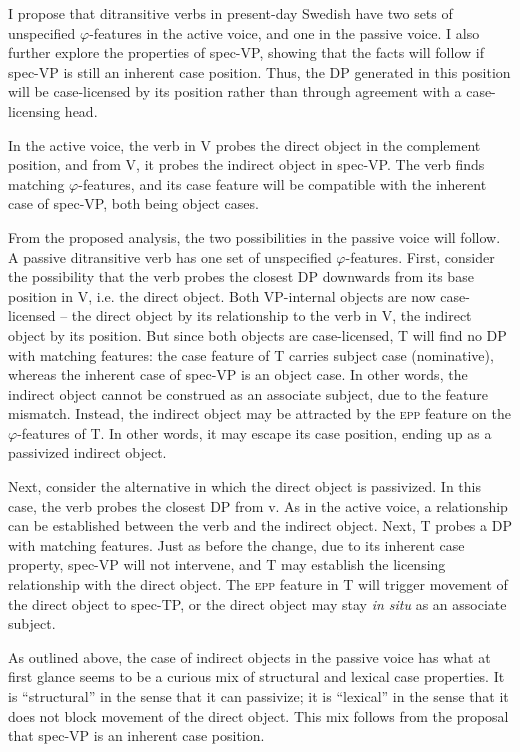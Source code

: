 \documentclass[output=paper]{langscibook}
\begin{document}
I propose that ditransitive verbs in present-day Swedish have two sets of unspecified $\varphi $-features in the active voice, and one in the passive voice. I also further explore the properties of spec-VP, showing that the facts will follow if spec-VP is still an inherent case position. Thus, the DP generated in this position will be case-licensed by its position rather than through agreement with a case-licensing head.



In the active voice, the verb in V probes the direct object in the complement position, and from V, it probes the indirect object in spec-VP. The verb finds matching $\varphi $-features, and its case feature will be compatible with the inherent case of spec-VP, both being object cases.



From the proposed analysis, the two possibilities in the passive voice will follow. A passive ditransitive verb has one set of unspecified $\varphi $-features. First, consider the possibility that the verb probes the closest DP downwards from its base position in V, i.e. the direct object. Both VP-internal objects are now case-licensed – the direct object by its relationship to the verb in V, the indirect object by its position. But since both objects are case-licensed, T will find no DP with matching features: the case feature of T carries subject case (nominative), whereas the inherent case of spec-VP is an object case. In other words, the indirect object cannot be construed as an associate subject, due to the feature mismatch. Instead, the indirect object may be attracted by the \textsc{epp} feature on the $\varphi $-features of T. In other words, it may escape its case position, ending up as a passivized indirect object.



Next, consider the alternative in which the direct object is passivized. In this case, the verb probes the closest DP from v. As in the active voice, a relationship can be established between the verb and the indirect object. Next, T probes a DP with matching features. Just as before the change, due to its inherent case property, spec-VP will not intervene, and T may establish the licensing relationship with the direct object. The \textsc{epp} feature in T will trigger movement of the direct object to spec-TP, or the direct object may stay \textit{in situ} as an associate subject.



As outlined above, the case of indirect objects in the passive voice has what at first glance seems to be a curious mix of structural and lexical case properties. It is “structural” in the sense that it can passivize; it is “lexical” in the sense that it does not block movement of the direct object. This mix follows from the proposal that spec-VP is an inherent case position.
\end{document}
